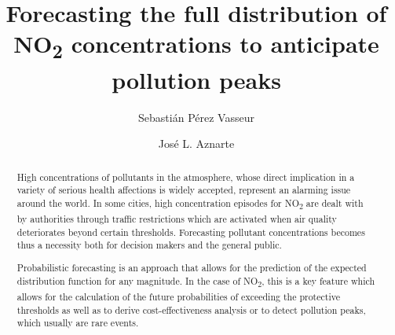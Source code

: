 \documentclass[a4paper,twocolumn,5p]{elsarticle}
\begin{document}
\pagewiselinenumbers

\newcommand{\no}{NO\textsubscript{2}\xspace}

\begin{frontmatter}

  \title{Forecasting the full distribution of \no concentrations to
    anticipate pollution peaks
  }

\author{Sebasti\'an P\'erez Vasseur} 
\address{Artificial Intelligence Department\\Universidad Nacional de
  Educaci\'on a Distancia --- UNED\\c/ Juan del Rosal, 16, Madrid, Spain}

\author{Jos\'e L. Aznarte}
\address{Artificial Intelligence Department\\Universidad Nacional de
  Educaci\'on a Distancia --- UNED\\c/ Juan del Rosal, 16, Madrid, Spain}


\begin{abstract}

  High concentrations of pollutants in the atmosphere, whose direct
  implication in a variety of serious health affections is widely
  accepted, represent an alarming issue around the world. In some
  cities, high concentration episodes for \no are dealt with by
  authorities through traffic restrictions which are activated when
  air quality deteriorates beyond certain thresholds. Forecasting
  pollutant concentrations becomes thus a necessity both for decision
  makers and the general public.

  Probabilistic forecasting is an approach that %
  allows for the prediction of the expected distribution function for
  any magnitude. In the case of \no, this is a key feature which
  allows for the calculation of the future probabilities of exceeding
  the protective thresholds as well as to derive cost-effectiveness
  analysis or to %
  detect pollution peaks, which usually are rare events.


\end{abstract}
\end{frontmatter}
\end{document}
